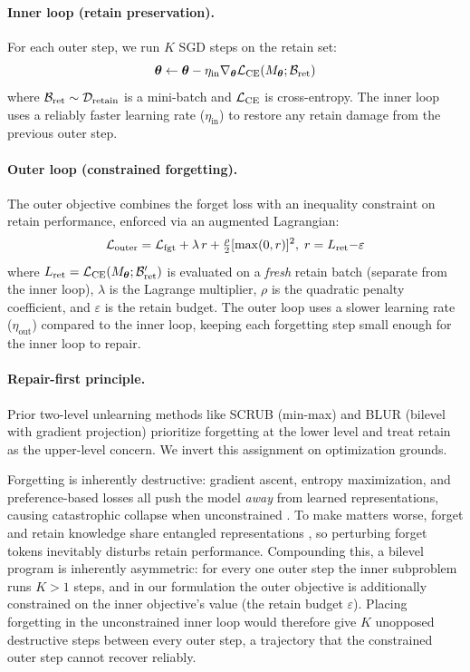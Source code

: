 \paragraph{Inner loop (retain preservation).}
For each outer step, we run $K$ SGD steps on the retain set:
\begin{equation}
    \boldsymbol{\theta} \leftarrow \boldsymbol{\theta} - \eta_{\text{in}} \nabla_{\boldsymbol{\theta}} \mathcal{L}_{\text{CE}}(M_{\boldsymbol{\theta}}; \mathcal{B}_{\text{ret}})
    \label{eq:inner}
\end{equation}
where $\mathcal{B}_{\text{ret}} \sim \mathcal{D}_\text{retain}$ is a mini-batch and $\mathcal{L}_{\text{CE}}$ is cross-entropy.
The inner loop uses a reliably faster learning rate ($\eta_{\text{in}}$) to restore any retain damage from the previous outer step.

\paragraph{Outer loop (constrained forgetting).}
The outer objective combines the forget loss with an inequality constraint on retain performance, enforced via an augmented Lagrangian:
\begin{equation}
    \mathcal{L}_{\text{outer}} = \mathcal{L}_{\text{fgt}} + \lambda\, r + \tfrac{\rho}{2}[\max(0,r)]^2,\; r = L_{\text{ret}} {-} \varepsilon
    \label{eq:outer}
\end{equation}
where $L_{\text{ret}} = \mathcal{L}_{\text{CE}}(M_{\boldsymbol{\theta}}; \mathcal{B}'_{\text{ret}})$ is evaluated on a \emph{fresh} retain batch (separate from the inner loop), $\lambda$ is the Lagrange multiplier, $\rho$ is the quadratic penalty coefficient, and $\varepsilon$ is the retain budget.
The outer loop uses a slower learning rate ($\eta_{\text{out}}$) compared to the inner loop, keeping each forgetting step small enough for the inner loop to repair.

\paragraph{Repair-first principle.}
Prior two-level unlearning methods like SCRUB \citep{kurmanji2023towards} (min-max) and BLUR \citep{reisizadeh2026blur} (bilevel with gradient projection) prioritize forgetting at the lower level and treat retain as the upper-level concern. We invert this assignment on optimization grounds.

Forgetting is inherently destructive: gradient ascent, entropy maximization, and preference-based losses all push the model \emph{away} from learned representations, causing catastrophic collapse when unconstrained \citep{zhang2024negative}. To make matters worse, forget and retain knowledge share entangled representations \citep{cheng2026unlearning}, so perturbing forget tokens inevitably disturbs retain performance. Compounding this, a bilevel program is inherently asymmetric: for every one outer step the inner subproblem runs $K\!>\!1$ steps, and in our formulation the outer objective is additionally constrained on the inner objective's value (the retain budget $\varepsilon$). Placing forgetting in the unconstrained inner loop would therefore give $K$ unopposed destructive steps between every outer step, a trajectory that the constrained outer step cannot recover reliably.


